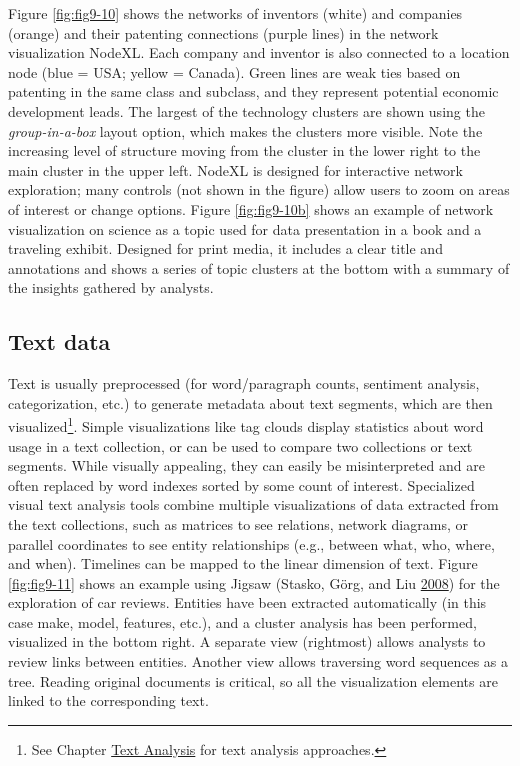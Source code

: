 \documentclass[]{krantz}
\begin{document}
Figure \ref{fig:fig9-10} shows the networks of inventors (white) and
companies (orange) and their patenting connections (purple lines) in the
network visualization NodeXL. Each company and inventor is also
connected to a location node (blue = USA; yellow = Canada). Green lines
are weak ties based on patenting in the same class and subclass, and
they represent potential economic development leads. The largest of the
technology clusters are shown using the \emph{group-in-a-box} layout
option, which makes the clusters more visible. Note the increasing level
of structure moving from the cluster in the lower right to the main
cluster in the upper left. NodeXL is designed for interactive network
exploration; many controls (not shown in the figure) allow users to zoom
on areas of interest or change options. Figure \ref{fig:fig9-10b} shows
an example of network visualization on science as a topic used for data
presentation in a book and a traveling exhibit. Designed for print
media, it includes a clear title and annotations and shows a series of
topic clusters at the bottom with a summary of the insights gathered by
analysts.

\subsection{Text data}\label{sec:viz-2.7}

Text is usually preprocessed (for word/paragraph counts, sentiment
analysis, categorization, etc.) to generate metadata about text
segments, which are then visualized\footnote{See Chapter
  \protect\hyperlink{chap:text}{Text Analysis} for text analysis
  approaches.}. Simple visualizations like tag clouds display statistics
about word usage in a text collection, or can be used to compare two
collections or text segments. While visually appealing, they can easily
be misinterpreted and are often replaced by word indexes sorted by some
count of interest. Specialized visual text analysis tools combine
multiple visualizations of data extracted from the text collections,
such as matrices to see relations, network diagrams, or parallel
coordinates to see entity relationships (e.g., between what, who, where,
and when). Timelines can be mapped to the linear dimension of text.
Figure \ref{fig:fig9-11} shows an example using Jigsaw (Stasko, Görg,
and Liu \protect\hyperlink{ref-stasko2008jigsaw}{2008}) for the
exploration of car reviews. Entities have been extracted automatically
(in this case make, model, features, etc.), and a cluster analysis has
been performed, visualized in the bottom right. A separate view
(rightmost) allows analysts to review links between entities. Another
view allows traversing word sequences as a tree. Reading original
documents is critical, so all the visualization elements are linked to
the corresponding text.
\end{document}
